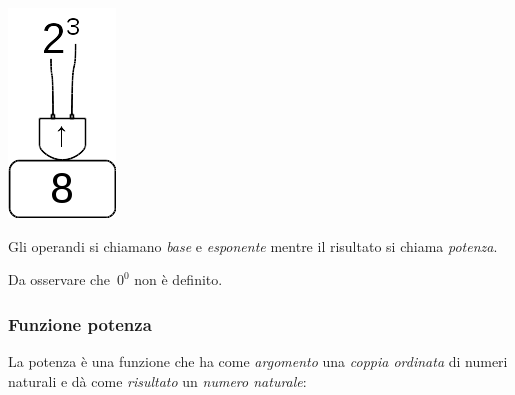 \begin{inaccessibleblock}[]
\begin{minipage}{0.80\textwidth}
 \centering
   
\end{minipage}%
\begin{minipage}{0.15\textwidth}
 \centering
 \includegraphics[scale=0.35]{img/op_pot.png}
\end{minipage}%
\end{inaccessibleblock}

Gli operandi si chiamano \emph{base} e \emph{esponente} mentre il 
risultato si chiama \emph{potenza}.

Da osservare che~\(0^0\) non è definito.

\subsubsection{Funzione potenza}

La potenza è una funzione che ha come \emph{argomento} una \emph{coppia 
ordinata} di numeri naturali e dà come \emph{risultato} un \emph{numero 
naturale}:

\vspace{2em}
\begin{minipage}[t]{.48\textwidth}
\begin{center}
\begin{inaccessibleblock}
\end{inaccessibleblock}
\end{center}
\end{minipage}
\hfill
\begin{minipage}[t]{.48\textwidth}
\begin{center}
\begin{inaccessibleblock}
\end{inaccessibleblock}
\end{center}
\end{minipage}

